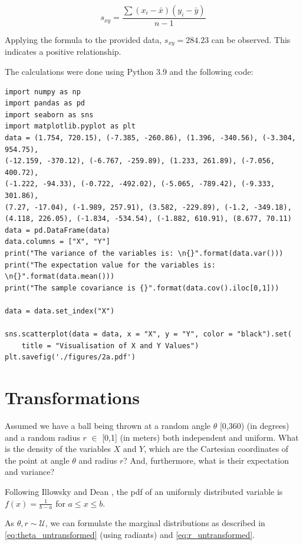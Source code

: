 \begin{equation}  s_{xy} = \frac{\sum(x_{i}-\bar{x})(y_{i}-\bar{y})}{n-1}
\label{eq:COV}
\end{equation}

Applying the formula to the provided data, $s_{xy} = 284.23$ can be observed. This indicates a positive relationship.

The calculations were done using Python 3.9 and the following code:

\begin{verbatim}
import numpy as np
import pandas as pd
import seaborn as sns
import matplotlib.pyplot as plt
data = (1.754, 720.15), (-7.385, -260.86), (1.396, -340.56), (-3.304, 954.75),
(-12.159, -370.12), (-6.767, -259.89), (1.233, 261.89), (-7.056, 400.72), 
(-1.222, -94.33), (-0.722, -492.02), (-5.065, -789.42), (-9.333, 301.86),
(7.27, -17.04), (-1.989, 257.91), (3.582, -229.89), (-1.2, -349.18), 
(4.118, 226.05), (-1.834, -534.54), (-1.882, 610.91), (8.677, 70.11)
data = pd.DataFrame(data)
data.columns = ["X", "Y"]
print("The variance of the variables is: \n{}".format(data.var()))
print("The expectation value for the variables is: \n{}".format(data.mean()))
print("The sample covariance is {}".format(data.cov().iloc[0,1]))

data = data.set_index("X")

sns.scatterplot(data = data, x = "X", y = "Y", color = "black").set(
    title = "Visualisation of X and Y Values")
plt.savefig('./figures/2a.pdf')
\end{verbatim}


\section{Transformations}
Assumed we have a ball being thrown at a random angle $\theta$ [0,360) (in degrees) and a random radius $r$ $\in$ [0,1] (in meters) both independent and uniform. What is the density of the variables $X$ and $Y$, which are the Cartesian coordinates of the point at angle $\theta$ and radius $r$? And, furthermore, what is their expectation and variance?

Following Illowsky and Dean \cite[Chapter~5.2]{illowsky2018introductory}, the pdf of an uniformly distributed variable is $f(x) = \frac{1}{b-a}$ for $a \leq x \leq b$. 

As $\theta,r \sim \mathcal{U}$, we can formulate the marginal distributions as described in \eqref{eq:theta_untransformed} (using radiants) and \eqref{eq:r_untransformed}.

